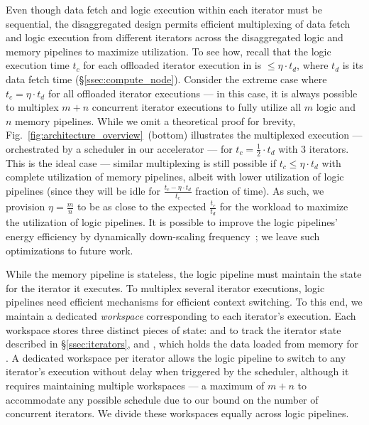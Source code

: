 Even though data fetch and logic execution within each iterator must be sequential, the disaggregated design permits efficient multiplexing of data fetch and logic execution from different iterators across the disaggregated logic and memory pipelines to maximize utilization. To see how, recall that the logic execution time $t_c$ for each offloaded iterator execution in \name is $\leq\eta\cdot t_d$, where $t_d$ is its data fetch time (\S\ref{ssec:compute_node}). Consider the extreme case where $t_c=\eta \cdot t_d$ for all offloaded iterator executions --- in this case, it is always possible to multiplex $m+n$ concurrent iterator executions to fully utilize all $m$ logic and $n$ memory pipelines. While we omit a theoretical proof for brevity, Fig.~\ref{fig:architecture_overview}~(bottom) illustrates the multiplexed execution --- orchestrated by a scheduler in our accelerator --- for $t_c=\frac{1}{2}\cdot t_d$ with $3$ iterators. This is the ideal case --- similar multiplexing is still possible if $t_c\leq\eta\cdot t_d$ with complete utilization of memory pipelines, albeit with lower utilization of logic pipelines (since they will be idle for $\frac{t_c - \eta\cdot t_d}{t_c}$ fraction of time). As such, we provision $\eta=\frac{m}{n}$ to be as close to the expected $\frac{t_c}{t_d}$ for the workload to maximize the utilization of logic pipelines. It is possible to improve the logic pipelines' energy efficiency by dynamically down-scaling frequency~\cite{daepowerscaling}; we leave such optimizations to future work.

While the memory pipeline is stateless, the logic pipeline must maintain the state for the iterator it executes. To multiplex several iterator executions, logic pipelines need efficient mechanisms for efficient context switching. To this end, we maintain a dedicated \emph{workspace} corresponding to each iterator's execution. Each workspace stores three distinct pieces of state:  and  to track the iterator state described in \S\ref{ssec:iterators}, and , which holds the data loaded from memory for . A dedicated workspace per iterator allows the logic pipeline to switch to any iterator's execution without delay when triggered by the scheduler, although it requires maintaining multiple workspaces --- a maximum of $m+n$ to accommodate any possible schedule due to our bound on the number of concurrent iterators. We divide these workspaces equally across logic pipelines.


